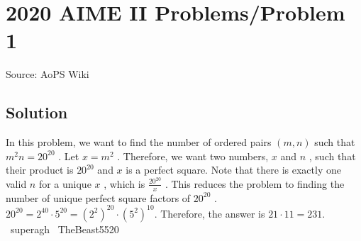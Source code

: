 \documentclass[12pt]{article}
\begin{document}
\section*{{2020 AIME II Problems/Problem 1}}
Source: AoPS Wiki

\subsection*{Solution}
In this problem, we want to find the number of ordered pairs $(m, n)$ such that $m^2n = 20^{20}$ . Let $x = m^2$ . Therefore, we want two numbers, $x$ and $n$ , such that their product is $20^{20}$ and $x$ is a perfect square. Note that there is exactly one valid $n$ for a unique $x$ , which is $\tfrac{20^{20}}{x}$ . This reduces the problem to finding the number of unique perfect square factors of $20^{20}$ . $20^{20} = 2^{40} \cdot 5^{20} = \left(2^2\right)^{20}\cdot\left(5^2\right)^{10}.$ Therefore, the answer is $21 \cdot 11 = \boxed{231}.$ ~superagh ~TheBeast5520
\end{document}
